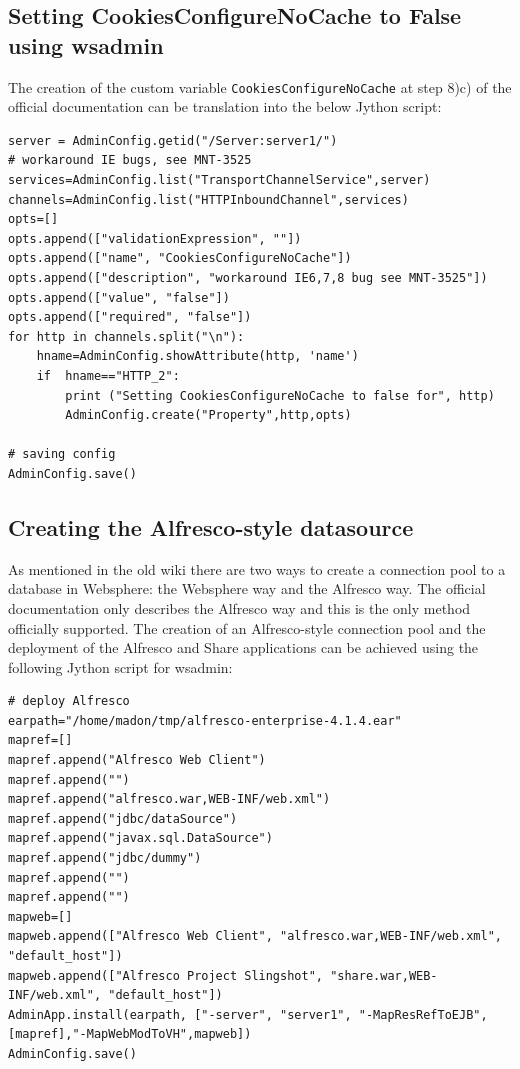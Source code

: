 \documentclass[10pt,a4]{article}
\begin{document}
\subsection{Setting CookiesConfigureNoCache to False using wsadmin}

The creation of the custom variable {\tt CookiesConfigureNoCache} at step 8)c) of the official documentation can be translation into the below Jython script:
\begin{verbatim}
server = AdminConfig.getid("/Server:server1/")
# workaround IE bugs, see MNT-3525
services=AdminConfig.list("TransportChannelService",server)
channels=AdminConfig.list("HTTPInboundChannel",services)
opts=[]
opts.append(["validationExpression", ""])
opts.append(["name", "CookiesConfigureNoCache"])
opts.append(["description", "workaround IE6,7,8 bug see MNT-3525"])
opts.append(["value", "false"])
opts.append(["required", "false"])
for http in channels.split("\n"):
    hname=AdminConfig.showAttribute(http, 'name')
    if  hname=="HTTP_2":
        print ("Setting CookiesConfigureNoCache to false for", http)
        AdminConfig.create("Property",http,opts)

# saving config
AdminConfig.save()
\end{verbatim}

\subsection{Creating the Alfresco-style datasource}
As mentioned in the old wiki\cite{wikiwas} there are two ways to create a connection pool to a database in Websphere: the Websphere way and the Alfresco way. The official documentation only describes the Alfresco way and this is the only method officially supported.
The creation of an Alfresco-style connection pool and the deployment of the Alfresco and Share applications can be achieved using the following Jython script for wsadmin:

\begin{verbatim}
# deploy Alfresco
earpath="/home/madon/tmp/alfresco-enterprise-4.1.4.ear"
mapref=[]
mapref.append("Alfresco Web Client")
mapref.append("")
mapref.append("alfresco.war,WEB-INF/web.xml")
mapref.append("jdbc/dataSource")
mapref.append("javax.sql.DataSource")
mapref.append("jdbc/dummy")
mapref.append("")
mapref.append("")
mapweb=[]
mapweb.append(["Alfresco Web Client", "alfresco.war,WEB-INF/web.xml", "default_host"])
mapweb.append(["Alfresco Project Slingshot", "share.war,WEB-INF/web.xml", "default_host"])
AdminApp.install(earpath, ["-server", "server1", "-MapResRefToEJB", [mapref],"-MapWebModToVH",mapweb])
AdminConfig.save()
\end{verbatim}
\end{document}
